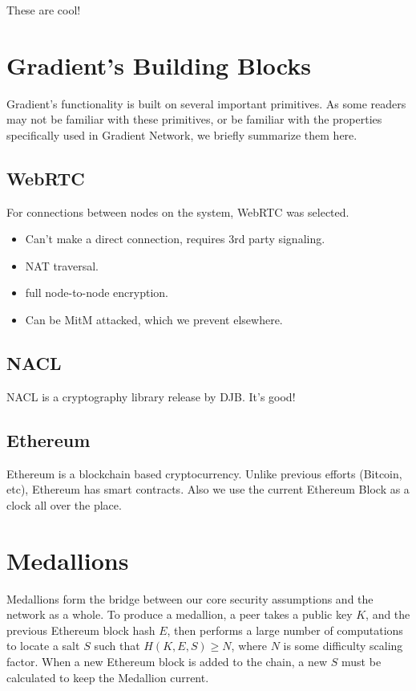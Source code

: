 \documentclass{article}
\begin{document}
These are cool!

\section{Gradient’s Building Blocks}

Gradient’s functionality is built on several important primitives. As some readers may not be familiar with these primitives, or be familiar with the properties specifically used in Gradient Network, we briefly summarize them here.

\subsection{WebRTC}

For connections between nodes on the system, WebRTC was selected.

\begin{itemize}
    \item Can’t make a direct connection, requires 3rd party signaling.
    \item NAT traversal.
    \item full node-to-node encryption.
    \item Can be MitM attacked, which we prevent elsewhere.
\end{itemize}

\subsection{NACL}

NACL is a cryptography library release by DJB. It’s good!

\subsection{Ethereum}

Ethereum is a blockchain based cryptocurrency. Unlike previous efforts (Bitcoin, etc), Ethereum has smart contracts. Also we use the current Ethereum Block as a clock all over the place.

\section{Medallions}

Medallions form the bridge between our core security assumptions and the network as a whole. To produce a medallion, a peer takes a public key $K$, and the previous Ethereum block hash $E$, then performs a large number of computations to locate a salt $S$ such that $H(K, E, S) \geq N$, where $N$ is some difficulty scaling factor. When a new Ethereum block is added to the chain, a new $S$ must be calculated to keep the Medallion current.
\end{document}
